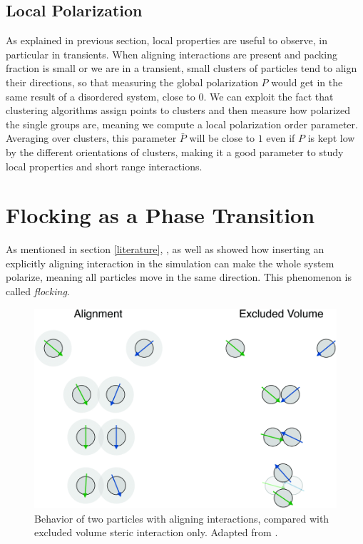 \documentclass[../../master_thesis_np.tex]{subfiles}
\begin{document}
		\subsection{Local Polarization}
		As explained in previous section, local properties are useful to observe, in particular in transients. 
		When aligning interactions are present and packing fraction is small or we are in a transient, small clusters of particles tend to align their directions, so that measuring the global polarization $P$ would get in the same result of a disordered system, close to $0$. 
		We can exploit the fact that clustering algorithms assign points to clusters and then measure how polarized the single groups are, meaning we compute a local polarization order parameter. 
		Averaging over clusters, this parameter $\bar{P}$ will be close to $1$ even if $P$ is kept low by the different orientations of clusters, making it a good parameter to study local properties and short range interactions.
		
		\section{Flocking as a Phase Transition}
		As mentioned in section \ref{literature}, \citeauthor{martin-gomez_collective_2018}, as well as \citeauthor{negi_emergent_2022} showed how inserting an explicitly aligning interaction in the simulation can make the whole system polarize, meaning all particles move in the same direction. 
		This phenomenon is called \emph{flocking}.
		
		\begin{figure}[htp]
			\centering
			\includegraphics[width=\textwidth]{alignment.png}
			\caption{Behavior of two particles with aligning interactions, compared with excluded volume steric interaction only. Adapted from \cite{martin-gomez_collective_2018}.}
			\label{fig:alignment}
		\end{figure}
		
\end{document}
